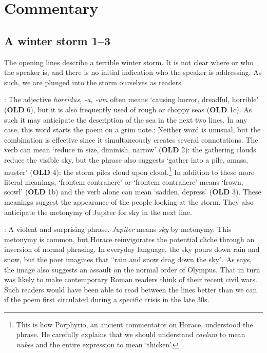 \chapter*{Commentary}

\section*{A winter storm 1--3}

The opening lines describe a terrible winter storm.  It is not clear where or who the speaker is, and there is no initial indication who the speaker is addressing.  As such, we are plunged into the storm ourselves as readers.


: The adjective \textit{horridus, -a, -um} often means `causing horror, dreadful, horrible' (\textbf{OLD} 6), but it is also frequently used of rough or choppy seas (\textbf{OLD} 1c).  As such it may anticipate the description of the sea in the next two lines.  In any case, this word starts the poem on a grim note.\indent{}:  Neither word is unusual, but the combination is effective since it simultaneously creates several connotations.  The verb can mean `reduce in size, diminish, narrow' (\textbf{OLD} 2): the gathering clouds reduce the visible sky, but the phrase also suggests `gather into a pile, amass, muster' (\textbf{OLD} 4): the storm piles cloud upon cloud.\footnote{This is how Porphyrio, an ancient commentator on Horace, understood the phrase.  He carefully explains that we should understand \textit{caelum} to mean \textit{nubes} and the entire expression to mean `thicken'.}  In addition to these more literal meanings, `frontem contrahere' or `frontem contrahere' means `frown, scowl' (\textbf{OLD} 1b) and the verb alone can mean `sadden, depress' (\textbf{OLD} 3).  These meanings suggest the appearance of the people looking at the storm.  They also anticipate the metonymy of Jupiter for sky in the next line.


: A violent and surprising phrase.  \textit{Jupiter} means \textit{sky} by metonymy.  This metonymy is common, but Horace reinvigorates the potential cliche through an inversion of normal phrasing.  In everyday language, the sky pours down rain and snow, but the poet imagines that ``rain and snow drag down the sky".  As \citet[215]{mankin1995} says, the image also suggests an assault on the normal order of Olympus.  That in turn was likely to make contemporary Roman readers think of their recent civil wars.  Such readers would have been able to read between the lines better than we can if the poem first circulated during a specific crisis in the late 30s.


